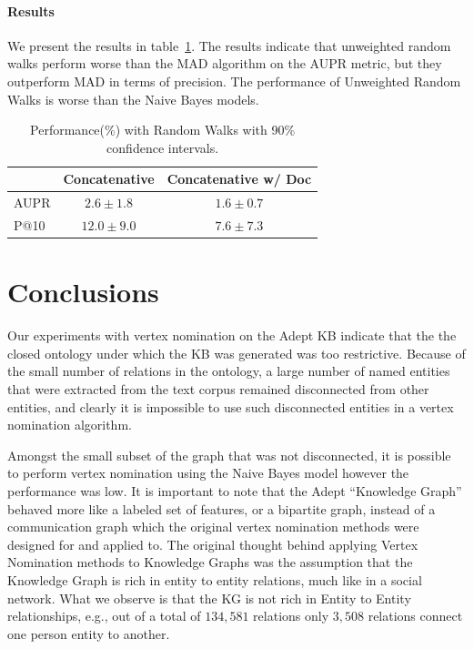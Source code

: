 \documentclass[paper=a4,fontsize=11pt]{scrartcl}
\newcommand{\eg}{e.g.,\xspace}
\newcommand{\tabref}[1]{table~\ref{#1}}
\numberwithin{equation}{section}    %
\numberwithin{figure}{section}      %
\numberwithin{table}{section}       %
\begin{document}
\paragraph{Results} We present the results in \tabref{tab:perf-rw}.
The results indicate that unweighted random walks perform
worse than the MAD algorithm on the AUPR metric, but they outperform MAD in terms of precision.
The performance of Unweighted Random Walks is worse than the Naive Bayes models.
\begin{table}[htbp]
  \centering
  \begin{tabular}{l | c c}
         & Concatenative & Concatenative w/ Doc \\\hline
    AUPR & $ 2.6 \pm 1.8 $       & $ 1.6 \pm 0.7 $      \\
    P@10 & $ 12.0 \pm 9.0 $      & $ 7.6 \pm 7.3 $      \\
  \end{tabular}
  \caption{Performance(\%) with Random Walks with 90\% confidence intervals.}
  \label{tab:perf-rw}
\end{table}


\section{Conclusions}
\label{sec:conclusions}
Our experiments with vertex nomination on the Adept KB indicate that
the the closed ontology under which the KB was generated was too restrictive.
Because of the small number of relations in the ontology, a
large number of named entities that were extracted from the text corpus
remained disconnected from other entities, and clearly it is impossible to
use such disconnected entities in a vertex nomination algorithm.

Amongst the small subset of the graph that was not disconnected, it is possible
to perform vertex nomination using the Naive Bayes model however the performance
was low. It is important to note that the Adept ``Knowledge Graph'' behaved more
like a labeled set of features, or a bipartite graph, instead of a communication
graph which the original vertex nomination methods were designed for and applied
to. {The original thought behind applying Vertex Nomination methods to Knowledge
  Graphs was the assumption that the Knowledge Graph is rich in entity to entity
  relations, much like in a social network. What
we observe is that the KG is not rich in Entity to Entity relationships, \eg out
of a total of $134,581$ relations only $3,508$ relations connect one person
entity to another.}
\end{document}
